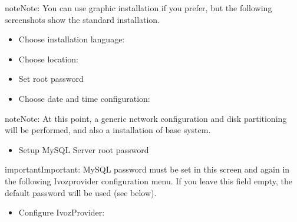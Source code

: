 \documentclass[letterpaper,10pt,english]{sphinxmanual}
\begin{document}
\begin{notice}{note}{Note:}
You can use graphic installation if you prefer, but the following
screenshots show the standard installation.
\end{notice}

\noindent{}
\begin{itemize}
\item {} 
Choose installation language:

\end{itemize}

\noindent{}
\begin{itemize}
\item {} 
Choose location:

\end{itemize}

\noindent{}
\begin{itemize}
\item {} 
Set root password

\end{itemize}

\noindent{}
\begin{itemize}
\item {} 
Choose date and time configuration:

\end{itemize}

\noindent{}

\begin{notice}{note}{Note:}
At this point, a generic network configuration and disk partitioning
will be performed, and also a installation of base system.
\end{notice}
\begin{itemize}
\item {} 
Setup MySQL Server root password

\end{itemize}

\noindent{}

\begin{notice}{important}{Important:}
MySQL password must be set in this screen and again in the following
Ivozprovider configuration menu. If you leave this field empty, the default password
will be used (see below).
\end{notice}
\begin{itemize}
\item {} 
Configure IvozProvider:

\end{itemize}
\end{document}
